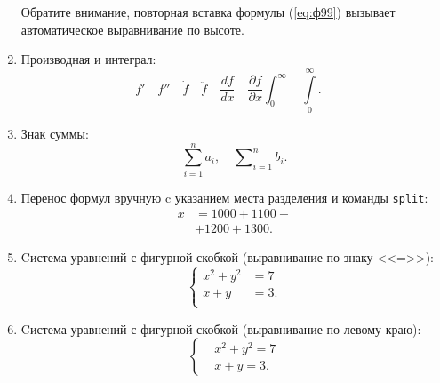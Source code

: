 \begin{enumerate}
Обратите внимание, повторная вставка формулы (\ref{eq:ф99}) вызывает автоматическое выравнивание по высоте.
\item Производная и интеграл:
{\zerodisplayskips
	\begin{equation}	
	f'\quad f''\quad
	\dot{f}\quad \ddot{f} \quad
	\frac{d f}{d x}\quad
	\frac{\partial f}{\partial x}
	\int_0^{\infty}\quad
	\int\limits_0^{\infty}.\quad
	\label{eq:ф10}
	\end{equation}
}%
\item Знак суммы:
{\zerodisplayskips
	\begin{equation}	
	\sum_{i=1}^n a_i,\quad
	\sum\nolimits_{i=1}^n b_i.
	\label{eq:ф11}
	\end{equation}
}
\item Перенос формул вручную c указанием места разделения и команды \verb=split=:
{\zerodisplayskips
	\begin{equation}	
	\begin{split}
	x&=1000+1100+{}\\
	 &+1200+1300.
	\end{split}
	\label{eq:ф12}
	\end{equation}
}
\item Cистема уравнений с фигурной скобкой (выравнивание по знаку <<=>>):
{%
	\begin{equation}	
	\left\{
	\begin{aligned}
	x^2+y^2&=7 \\
	x+y & = 3. \\
	\end{aligned}
	\right.
	\end{equation}
}
\item Cистема уравнений с фигурной скобкой (выравнивание по левому краю):
{%
	\begin{equation}	
	\left\{
	\begin{aligned}
	& x^2+y^2=7 \\
	& x+y=3.
	\end{aligned}
	\right.
	\end{equation}
}

\end{enumerate}
